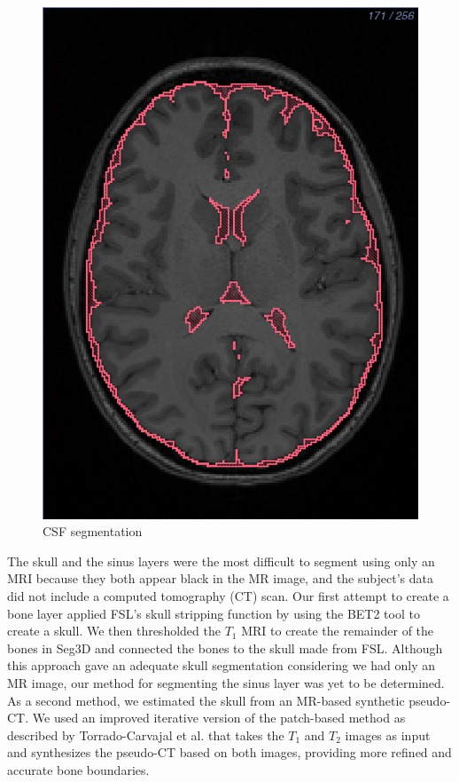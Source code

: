 \begin{figure}[H]
\begin{center}
\includegraphics[width=.49\textwidth]{Figures/CSF_seg}
\caption{CSF segmentation}
\label{fig:csf}
\end{center}
\end{figure}

The skull and the sinus layers were the most difficult to segment using only an MRI because they both appear black in the MR image, and the subject's data did not include a computed tomography (CT) scan. Our first attempt to create a bone layer applied FSL's skull stripping function by using the BET2 tool to create a skull. We then thresholded the $T_1$ MRI to create the remainder of the bones in Seg3D and connected the bones to the skull made from FSL. Although this approach gave an adequate skull segmentation considering we had only an MR image, our method for segmenting the sinus layer was yet to be determined. As a second method, we estimated the skull from an MR-based synthetic pseudo-CT. We used an improved iterative version of the patch-based method as described by Torrado-Carvajal et al. \cite{ref:pseudoct} that takes the $T_1$ and $T_2$ images as input and synthesizes the pseudo-CT based on both images, providing more refined and accurate bone boundaries.

